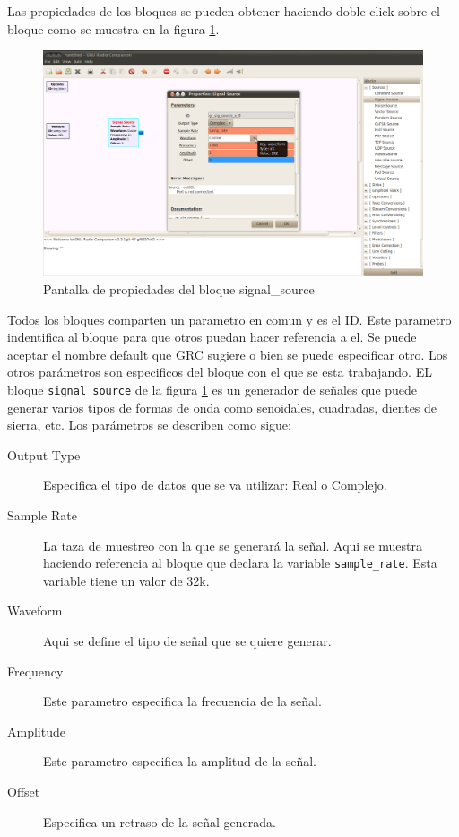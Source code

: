 Las propiedades de los bloques se pueden obtener haciendo doble click sobre el bloque como se
muestra en la figura \ref{fig:blockprop}.

\begin{figure}[tp]
  \centering
  \includegraphics[width=5.5in]{figs/grc3}
  \vspace{0.3in}
  \caption{Pantalla de propiedades del bloque signal\_source}
  \label{fig:blockprop}
\end{figure}

Todos los bloques comparten un parametro en comun y es el ID. Este parametro indentifica al bloque
para que otros puedan hacer referencia a el. Se puede aceptar el nombre default que GRC sugiere o
bien se puede especificar otro. Los otros par\'ametros son especificos del bloque con el que se esta
trabajando. EL bloque \verb|signal_source| de la figura \ref{fig:blockprop} es un generador de
se\~nales que puede generar varios tipos de formas de onda como senoidales, cuadradas, dientes de
sierra, etc. Los par\'ametros se describen como sigue:

\begin{description}
\item[Output Type] Especifica el tipo de datos que se va utilizar: Real o Complejo.
\item[Sample Rate] La taza de muestreo con la que se generar\'a la se\~nal. Aqui se muestra haciendo
referencia al bloque que declara la variable \verb|sample_rate|. Esta variable tiene un valor de
32k.
\item[Waveform] Aqui se define el tipo de se\~nal que se quiere generar.
\item[Frequency] Este parametro especifica la frecuencia de la se\~nal.
\item[Amplitude] Este parametro especifica la amplitud de la se\~nal.
\item[Offset] Especifica un retraso de la se\~nal generada.
\end{description}

